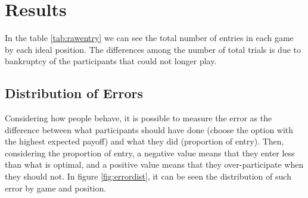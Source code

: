 \section{Results}



In the table \ref{tab:rawentry}  we can see the total number of entries in each game by each ideal position. The differences among the number of total trials is due to bankruptcy of the participants that could not longer play.



\subsection{Distribution of Errors}

Considering how people behave, it is possible to measure the error as the difference between what participants should have done (choose the option with the highest expected payoff) and what they did (proportion of entry). Then, considering the proportion of entry, a negative value means that they enter less than what is optimal, and a positive value means that they over-participate when they should not. In figure \ref{fig:errordist}, it can be seen the distribution of such error by game and position.



